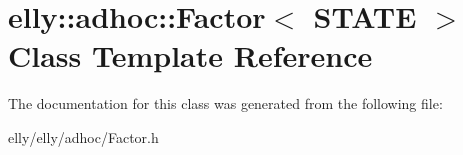 \hypertarget{classelly_1_1adhoc_1_1_factor}{\section{elly\-:\-:adhoc\-:\-:Factor$<$ S\-T\-A\-T\-E $>$ Class Template Reference}
\label{classelly_1_1adhoc_1_1_factor}
}


The documentation for this class was generated from the following file\-:\begin{DoxyCompactItemize}
\item 
elly/elly/adhoc/Factor.\-h\end{DoxyCompactItemize}
